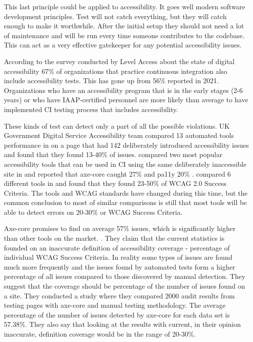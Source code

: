 \documentclass{master_thesis}
\begin{document}
This last principle could be applied to accessibility. It goes well modern software development principles. Test will not catch everything, but they will catch enough to make it worthwhile. After the initial setup they should not need a lot of maintenance and will be run every time someone contributes to the codebase. This can act as a very effective gatekeeper for any potential accessibility issues.

According to the survey conducted by Level Access about the state of digital accessibility 67\% of organizations that practice continuous integration also include accessibility tests. This has gone up from 56\% reported in 2021. Organizations who have an accessibility program that is in the early stages (2-6 years) or who have IAAP-certified personnel are more likely than average to have implemented CI testing process that includes accessibility. \citep{LevelAccess}

These kinds of test can detect only a part of all the possible violations. UK Government Digital Service Accessibility team compared 13 automated tools performance in \citeyear{GAT2018} on a page that had 142 deliberately introduced accessibility issues and found that they found 13-40\% of issues. \citeauthor{Abbott2021} compared two most popular accessibility tools that can be used in CI using the same deliberately inaccessible site in \citeyear{Abbott2021} and reported that axe-core caught 27\% and pa11y 20\% \citep{Abbott2021}. \citeauthor{Vigo2013} compared 6 different tools in \citeyear{Vigo2013} and found that they found 23-50\% of  WCAG 2.0 Success Criteria. \citep{GAT2018,Abbott2021,Vigo2013} The tools and WCAG standards have changed during this time, but the common conclusion to most of similar comparisons is still that most tools will be able to detect errors on 20-30\% or WCAG Success Criteria. 

Axe-core promises to find on average 57\% issues, which is significantly higher than other tools on the market.  \citep{Deque2023}. They claim that the current statistics is founded on an inaccurate definition of accessibility coverage - percentage of individual WCAG Success Criteria. In reality some types of issues are found much more frequently and the issues found by automated tests form a higher percentage of all issues compared to those discovered by manual detection. They suggest that the coverage should be percentage of the number of issues found on a site.  They conducted a study where they compared 2000 audit results from testing pages with axe-core and manual testing methodology. The average percentage of the number of issues detected by axe-core for each data set is 57.38\%. They also say that looking at the results with current, in their opinion inaccurate, definition coverage would be in the range of 20-30\%. \citep{DequeSystems2021report}
\end{document}
